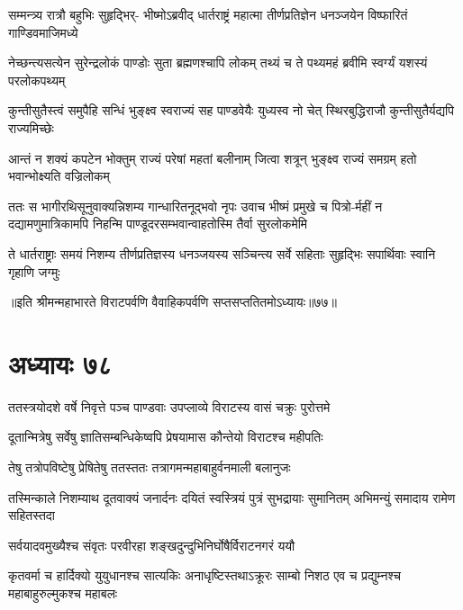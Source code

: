 \fourlineindentedshloka
{सम्मन्त्र्य रात्रौ बहुभिः सुहृद्भिर्-}
{भीष्मोऽब्रवीद् धार्तराष्ट्रं महात्मा}
{तीर्णप्रतिज्ञेन धनञ्जयेन}
{विष्फारितं गाण्डिवमाजिमध्ये}



\fourlineindentedshloka
{नेच्छन्त्यसत्येन सुरेन्द्रलोकं}
{पाण्डोः सुता ब्रह्मणश्चापि लोकम्}
{तथ्यं च ते पथ्यमहं ब्रवीमि}
{स्वर्ग्यं यशस्यं परलोकपथ्यम्}


\fourlineindentedshloka
{कुन्तीसुतैस्त्वं समुपैहि सन्धिं}
{भुङ्क्ष्व स्वराज्यं सह पाण्डवेयैः}
{युध्यस्व नो चेत् स्थिरबुद्धिराजौ}
{कुन्तीसुतैर्यद्यपि राज्यमिच्छेः}


\fourlineindentedshloka
{आन्तं न शक्यं कपटेन भोक्तुम्}
{राज्यं परेषां महतां बलीनाम्}
{जित्वा शत्रून् भुङ्क्ष्व राज्यं समग्रम्}
{हतो भवान्भोक्ष्यति वज्रिलोकम्}



\threelineshloka
{ततः स भागीरथिसूनुवाक्यन्निशम्य गान्धारितनूद्भवो नृपः}
{उवाच भीष्मं प्रमुखे च पित्रो-र्महीं न दद्यामणुमात्रिकामपि}
{निहन्मि पाण्डूदरसम्भवान्वाहतोस्मि तैर्वा सुरलोकमेमि}


\fourlineindentedshloka
{ते धार्तराष्ट्राः समयं निशम्य}
{तीर्णप्रतिज्ञस्य धनञ्जयस्य }
{सञ्चिन्त्य सर्वे सहिताः सुहृद्भिः}
{सपार्थिवाः स्वानि गृहाणि जग्मुः}

॥इति श्रीमन्महाभारते विराटपर्वणि वैवाहिकपर्वणि सप्तसप्ततितमोऽध्यायः॥७७॥

\chapter{अध्यायः ७८}

\twolineshloka
{ततस्त्रयोदशे वर्षे निवृत्ते पञ्च पाण्डवाः}
{उपप्लाव्ये विराटस्य वासं चक्रुः पुरोत्तमे}


\twolineshloka
{दूतान्मित्रेषु सर्वेषु ज्ञातिसम्बन्धिकेष्वपि}
{प्रेषयामास कौन्तेयो विराटश्च महीपतिः}


\twolineshloka
{तेषु तत्रोपविष्टेषु प्रेषितेषु ततस्ततः}
{तत्रागमन्महाबाहुर्वनमाली बलानुजः}


\threelineshloka
{तस्मिन्काले निशम्याथ दूतवाक्यं जनार्दनः}
{दयितं स्वस्त्रियं पुत्रं सुभद्रायाः सुमानितम्}
{अभिमन्युं समादाय रामेण सहितस्तदा}


\twolineshloka
{सर्वयादवमुख्यैश्च संवृतः परवीरहा}
{शङ्खदुन्दुभिनिर्घोषैर्विराटनगरं ययौ}


\threelineshloka
{कृतवर्मा च हार्दिक्यो युयुधानश्च सात्यकिः}
{अनाधृष्टिस्तथाऽक्रूरः साम्बो निशठ एव च}
{प्रद्युम्नश्च महाबाहुरुल्मुकश्च महाबलः}


